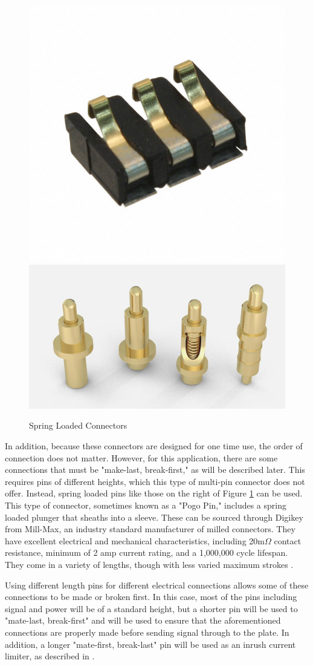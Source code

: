 \documentclass{article}
\begin{document}
		\begin{figure}
			\centering
			\includegraphics[width = 0.4\linewidth]{PR2Images/batteryconn}
			\includegraphics[width = 0.4\linewidth]{PR2Images/springpin.jpg}
			\label{fig:springloaded}
			\caption{Spring Loaded Connectors}
		\end{figure}

		In addition, because these connectors are designed for one time use, the order of connection does not matter.  However, for this application, there are some connections that must be "make-last, break-first," as will be described later.  This requires pins of different heights, which this type of multi-pin connector does not offer.  Instead, spring loaded pins like those on the right of Figure \ref{fig:springloaded} can be used.  This type of connector, sometimes known as a "Pogo Pin," includes a spring loaded plunger that sheaths into a sleeve.  These can be sourced through Digikey from Mill-Max, an industry standard manufacturer of milled connectors.  They have excellent electrical and mechanical characteristics, including 20m$\Omega$ contact resistance, minimum of 2 amp current rating, and a 1,000,000 cycle lifespan.  They come in a variety of lengths, though with less varied maximum strokes \cite{MillMax_025}.

		Using different length pins for different electrical connections allows some of these connections to be made or broken first.  In this case, most of the pins including signal and power will be of a standard height, but a shorter pin will be used to "mate-last, break-first" and will be used to ensure that the aforementioned connections are properly made before sending signal through to the plate.  In addition, a longer "mate-first, break-last" pin will be used as an inrush current limiter, as described in \cite{DesignforHotSwap}.
\end{document}
